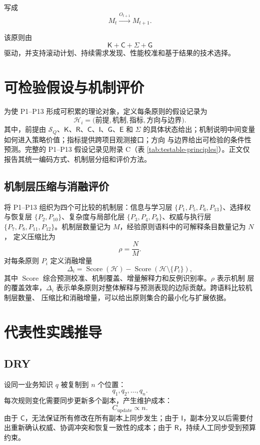 \documentclass[11pt,a4paper]{ctexart}
\numberwithin{equation}{section}
\theoremstyle{definition}
\theoremstyle{plain}
\newcommand{\Know}{\mathsf{K}}
\newcommand{\Res}{\mathsf{R}}
\newcommand{\Ctrl}{\mathsf{C}}
\newcommand{\Info}{\mathsf{I}}
\newcommand{\Goal}{\mathsf{G}}
\newcommand{\Eth}{\mathsf{E}}
\newcommand{\Learn}{\Sigma}
\begin{document}
写成
\[
M_t\xrightarrow{O_{t+1}}M_{t+1}.
\]

该原则由
\[
\Know+\Ctrl+\Learn+\Goal
\]
驱动，并支持滚动计划、持续需求发现、性能校准和基于结果的技术选择。

\section{可检验假设与机制评价}

为使 P1--P13 形成可积累的理论对象，定义每条原则的假设记录为
\[
\mathcal{H}_i=
\bigl(
\text{前提},\text{机制},\text{指标},\text{方向与边界}
\bigr).
\]
其中，前提由 $\mathcal{S}_Q$、$\Know$、$\Res$、$\Ctrl$、$\Info$、$\Goal$、$\Eth$ 和
$\Learn$ 的具体状态给出；机制说明中间变量如何进入策略价值；指标提供跨项目观测接口；方向
与边界给出可检验的条件性预测。完整的 P1--P13 假设记录见附录 C（表
\ref{tab:testable-principles}）。正文仅报告其统一编码方式、机制层分组和评价方法。

\subsection{机制层压缩与消融评价}

将 P1--P13 组织为四个可比较的机制层：信息与学习层
$\{P_1,P_5,P_6,P_{13}\}$、选择权与恢复层
$\{P_2,P_{10}\}$、复杂度与局部化层
$\{P_3,P_4,P_9\}$、权威与执行层
$\{P_7,P_8,P_{11},P_{12}\}$。机制层数量记为 $M$，经验原则语料中的可解释条目数量记为 $N$，
定义压缩比为
\[
\rho=\frac{N}{M}.
\]
对每条原则 $P_i$ 定义消融增量
\[
\Delta_i
=
\operatorname{Score}(\mathcal{H})
-
\operatorname{Score}(\mathcal{H}\setminus\{P_i\}),
\]
其中 $\operatorname{Score}$ 综合预测校准、机制覆盖、增量解释力和反例识别率。$\rho$ 表示机制
层的覆盖效率，$\Delta_i$ 表示单条原则对整体解释与预测表现的边际贡献。跨语料比较机制层数量、
压缩比和消融增量，可以给出原则集合的最小化与扩展依据。

\section{代表性实践推导}

\subsection{DRY}

设同一业务知识 $q$ 被复制到 $n$ 个位置：
\[
q_1,q_2,\ldots,q_n.
\]
每次规则变化需要同步更新多个副本，产生维护成本：
\[
C_{\mathrm{update}}\propto n.
\]
由于 $\Ctrl$，无法保证所有修改在所有副本上同步发生；由于 $\Info$，副本分叉以后需要付出重新确认权威、协调冲突和恢复一致性的成本；由于 $\Res$，持续人工同步受到预算约束。
\end{document}
